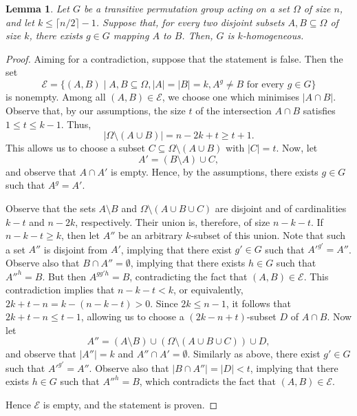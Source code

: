 \documentclass[a4paper]{amsart}
\newcommand{\cE}{\mathcal{E}}
\newtheorem{lemma}[theorem]{Lemma}
\theoremstyle{definition}
\begin{document}
\begin{lemma}
\label{lem:swing}
    Let $G$ be a transitive permutation group acting on a set $\Omega$ of size $n$, and let $k \le \lceil n/2\rceil - 1$.
    Suppose that, for every two disjoint subsets $A,B \subseteq \Omega$ of size $k$, there exists $g\in G$ mapping $A$ to $B$.
    Then, $G$ is $k$-homogeneous.
\end{lemma}
\begin{proof}
   Aiming for a contradiction, suppose that the statement is false. Then the set
   $$\cE = \{(A,B) \mid A,B \subseteq \Omega, |A| = |B| = k, A^g \neq B  \text{ for every } g \in G\}$$
   is nonempty.  Among all $(A,B) \in \cE$, we choose one which minimises $|A \cap B|$. Observe that, by our assumptions, the size $t$ of the intersection $A\cap B$ satisfies $1\le t \le k-1$. Thus,
   $$
   |\Omega \setminus (A\cup B)|  = n - 2k+t \ge t+1.$$
   This allows us to choose a subset $C\subseteq \Omega \setminus (A\cup B)$ with $|C|=t$. Now, let
   $$A' = (B\setminus A) \cup C ,$$
   and observe that $A\cap A'$ is empty.
   Hence, by the assumptions, there exists $g\in G$ such that $A^g = A'$.
   
   Observe that the sets $A\setminus B$ and
   $\Omega\setminus(A\cup B \cup C)$ are 
   disjoint and of cardinalities
   $k-t$ and $n-2k$, respectively. Their union is, therefore, of size $n-k-t$. If $n-k-t \ge k$, then let $A''$ be an arbitrary $k$-subset of this union. Note that such a set $A''$ is disjoint from $A'$, implying that there exist $g' \in G$ such that
   $A'^{g'} = A''$. Observe also that $B\cap A'' = \emptyset $, implying that there exists $h\in G$ such that $A''^h=B$.
   But then $A^{gg'h} = B$, contradicting the fact that $(A,B) \in \cE$. This contradiction implies that $n-k-t < k$,
or equivalently, $2k+t-n = k -(n-k -t) > 0$.
  Since $2k \le n-1$, it follows that $2k+t-n \le t-1$, allowing us to choose a $(2k-n+t)$-subset $D$ of $A\cap B$. Now let
   \[
   A'' = (A \setminus B) \cup (\Omega \setminus (A\cup B \cup C)) \cup D,
   \]
   and observe that $|A''| = k$ and $A'' \cap A' = \emptyset$.
   Similarly as above, there exist $g' \in G$ such that
   $A'^{g'} = A''$. Observe also that $|B\cap A''| = |D| < t$, implying that there exists $h\in G$ such that $A''^h=B$, which contradicts
   the fact that $(A,B) \in \cE$.

   Hence $\cE$ is empty, and the statement is proven.
\end{proof}
\end{document}

